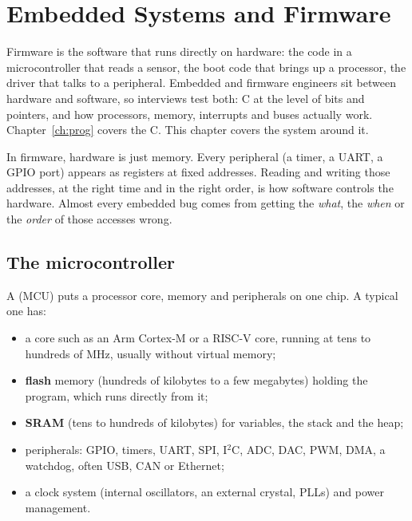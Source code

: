 \chapter{Embedded Systems and Firmware}
\label{ch:embedded}

Firmware is the software that runs directly on hardware: the code in a microcontroller that reads a sensor, the boot code that brings up a processor, the driver that talks to a peripheral. Embedded and firmware engineers sit between hardware and software, so interviews test both: C at the level of bits and pointers, and how processors, memory, interrupts and buses actually work. Chapter~\ref{ch:prog} covers the C. This chapter covers the system around it.

\begin{bigidea}
In firmware, hardware is just memory. Every peripheral (a timer, a UART, a GPIO port) appears as registers at fixed addresses. Reading and writing those addresses, at the right time and in the right order, is how software controls the hardware. Almost every embedded bug comes from getting the \emph{what}, the \emph{when} or the \emph{order} of those accesses wrong.
\end{bigidea}

\section{The microcontroller}

A  (MCU) puts a processor core, memory and peripherals on one chip. A typical one has:
\begin{itemize}
  \item a core such as an Arm Cortex-M or a RISC-V core, running at tens to hundreds of MHz, usually without virtual memory;
  \item \textbf{flash} memory (hundreds of kilobytes to a few megabytes) holding the program, which runs directly from it;
  \item \textbf{SRAM} (tens to hundreds of kilobytes) for variables, the stack and the heap;
  \item peripherals: GPIO, timers, UART, SPI, I$^2$C, ADC, DAC, PWM, DMA, a watchdog, often USB, CAN or Ethernet;
  \item a clock system (internal oscillators, an external crystal, PLLs) and power management.
\end{itemize}

